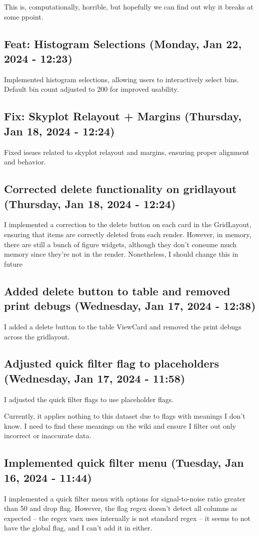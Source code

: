 \documentclass[a4paper]{article}
\begin{document}
This is, computationally, horrible, but hopefully we can find out why it breaks at some ppoint.

\subsection*{Feat: Histogram Selections (Monday, Jan 22, 2024 - 12:23)}
Implemented histogram selections, allowing users to interactively select bins. Default bin count adjusted to 200 for improved usability.

\subsection*{Fix: Skyplot Relayout + Margins (Thursday, Jan 18, 2024 - 12:24)}
Fixed issues related to skyplot relayout and margins, ensuring proper alignment and behavior.

\subsection*{Corrected delete functionality on gridlayout (Thursday, Jan 18, 2024 - 12:24)}
I implemented a correction to the delete button on each card in the GridLayout, ensuring that items are correctly deleted from each render. However, in memory, there are still a bunch of figure widgets, although they don't consume much memory since they're not in the render. Nonetheless, I should change this in future

\subsection*{Added delete button to table and removed print debugs (Wednesday, Jan 17, 2024 - 12:38)}
I added a delete button to the table ViewCard and removed the print debugs across the gridlayout.

\subsection*{Adjusted quick filter flag to placeholders (Wednesday, Jan 17, 2024 - 11:58)}
I adjusted the quick filter flags to use placeholder flags.

Currently, it applies nothing to this dataset due to flags with meanings I don't know. I need to find these meanings on the wiki and ensure I filter out only incorrect or inaccurate data.

\subsection*{Implemented quick filter menu (Tuesday, Jan 16, 2024 - 11:44)}
I implemented a quick filter menu with options for signal-to-noise ratio greater than 50 and drop flag. However, the flag regex doesn't detect all columns as expected -- the regex vaex uses internally is not standard regex -- it seems to not have the global flag, and I can't add it in either.
\end{document}
